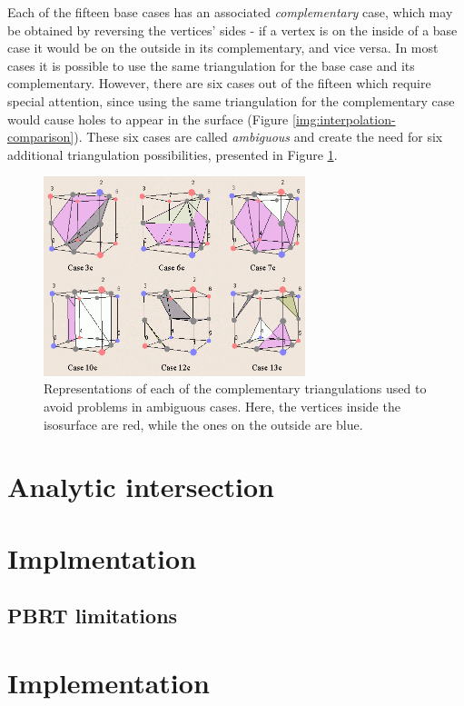 \documentclass[conference]{acmsiggraph}
\begin{document}
Each of the fifteen base cases has an associated \textit{complementary} case, which may be obtained by reversing the vertices' sides - if a vertex is on the inside of a base case it would be on the outside in its complementary, and vice versa. In most cases it is possible to use the same triangulation for the base case and its complementary. However, there are six cases out of the fifteen which require special attention, since using the same triangulation for the complementary case would cause holes to appear in the surface (Figure \ref{img:interpolation-comparison}). These six cases are called \textit{ambiguous} and create the need for six additional triangulation possibilities, presented in Figure \ref{img:ambiguous-cases}.

\begin{figure}[ht]
  \centering
  \includegraphics[width=3in]{images/ambiguous-cases}
  \caption{Representations of each of the complementary triangulations used to avoid problems in ambiguous cases. Here, the vertices inside the isosurface are red, while the ones on the outside are blue.}
  \label{img:ambiguous-cases}
\end{figure}

\section{Analytic intersection}

\section{Implmentation}

\subsection{PBRT limitations}

\section{Implementation}
\end{document}

